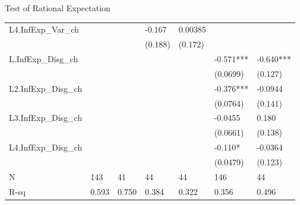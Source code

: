\documentclass{beamer}
\begin{document}
\begin{frame}{Test of Rational Expectation}
\begin{table}[tbhp]
{\begin{tabular}{lllllll}
		L4.InfExp\_Var\_ch  &               &                 & -0.167          & 0.00385          &                  &           \\
		&               &                 & (0.188)         & (0.172)          &                  &           \\
		L.InfExp\_Disg\_ch  &               &                 &                 &                  & -0.571***        & -0.640*** \\
		&               &                 &                 &                  & (0.0699)         & (0.127)   \\
		L2.InfExp\_Disg\_ch &               &                 &                 &                  & -0.376***        & -0.0944   \\
		&               &                 &                 &                  & (0.0764)         & (0.141)   \\
		L3.InfExp\_Disg\_ch &               &                 &                 &                  & -0.0455          & 0.180     \\
		&               &                 &                 &                  & (0.0661)         & (0.138)   \\
		L4.InfExp\_Disg\_ch &               &                 &                 &                  & -0.110*          & -0.0364   \\
		&               &                 &                 &                  & (0.0479)         & (0.123)   \\
		\hline 
		N                   & 143           & 41              & 44              & 44               & 146              & 44        \\
		R-sq                & 0.593         & 0.750           & 0.384           & 0.322            & 0.356            & 0.496    \\
		\hline 
	\end{tabular}
}
\end{table}
\end{frame}
\end{document}
